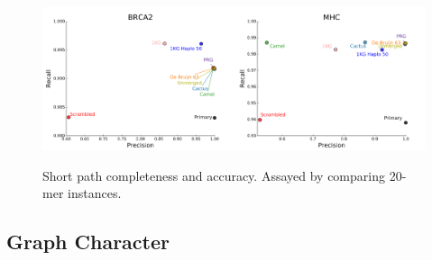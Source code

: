 \begin{figure}[htbp]
\centering
\includegraphics[width=0.5\textwidth]{figures/04_bakeoff/figure06_1.png}\includegraphics[width=0.5\textwidth]{figures/04_bakeoff/figure06_2.png}
\caption[Short path completeness and accuracy]{Short path completeness and accuracy. Assayed by comparing
20-mer instances.}
\label{fig:bakeoff:shortpaths}
\end{figure}

\subsection{Graph Character}

